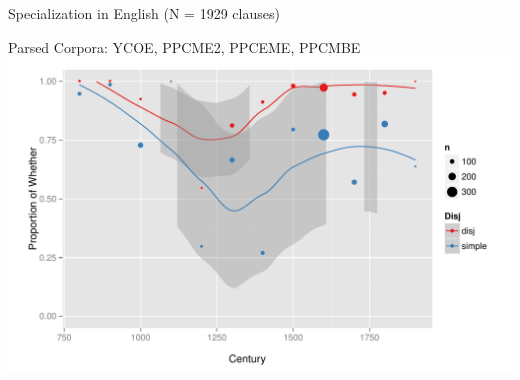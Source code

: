 \documentclass[hyperref={pdfpagelabels=false}]{beamer}
\begin{document}
%
%
% 
%
% 
%
%
\begin{frame}{Specialization in English (N = 1929 clauses)} 


\begin{center}
 \small{Parsed Corpora: YCOE, PPCME2, PPCEME, PPCMBE \nocite{ycoe,ppcme2,ppceme,ppcmbe}}
\includegraphics[width=1.1\textwidth]{whetherifEngLoess.pdf}
\end{center}
\end{frame}
\end{document}
